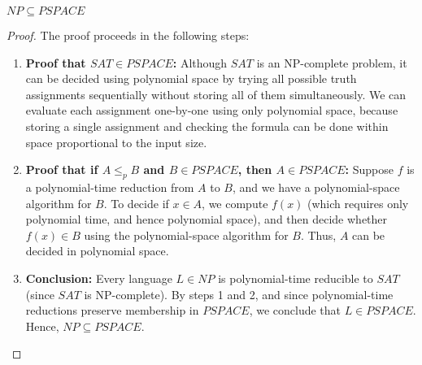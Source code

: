 \begin{theorem}
    $NP \subseteq PSPACE$
\end{theorem}

\begin{proof}
The proof proceeds in the following steps:
\begin{enumerate}
    \item \textbf{Proof that $SAT \in PSPACE$:}  
    Although $SAT$ is an NP-complete problem, it can be decided using polynomial space by trying all possible truth assignments sequentially without storing all of them simultaneously. We can evaluate each assignment one-by-one using only polynomial space, because storing a single assignment and checking the formula can be done within space proportional to the input size.

    \item \textbf{Proof that if $A \le_p B$ and $B \in PSPACE$, then $A \in PSPACE$:}  
    Suppose $f$ is a polynomial-time reduction from $A$ to $B$, and we have a polynomial-space algorithm for $B$. To decide if $x \in A$, we compute $f(x)$ (which requires only polynomial time, and hence polynomial space), and then decide whether $f(x) \in B$ using the polynomial-space algorithm for $B$. Thus, $A$ can be decided in polynomial space.

    \item \textbf{Conclusion:}  
    Every language $L \in NP$ is polynomial-time reducible to $SAT$ (since $SAT$ is NP-complete). By steps 1 and 2, and since polynomial-time reductions preserve membership in $PSPACE$, we conclude that $L \in PSPACE$. Hence, $NP \subseteq PSPACE$.
\end{enumerate}
\end{proof}


